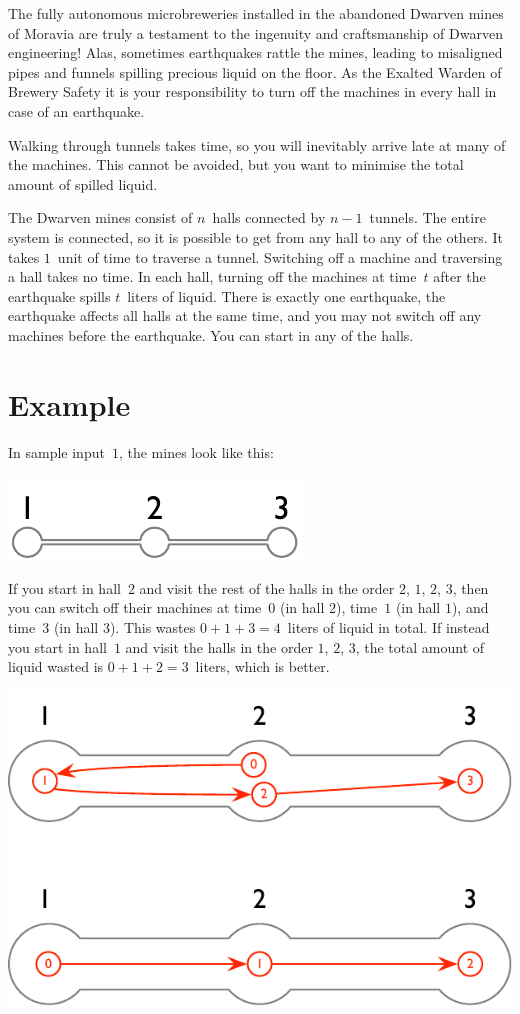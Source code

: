 
\noindent
The fully autonomous microbreweries installed in the abandoned Dwarven mines of Moravia are truly a testament to the ingenuity and craftsmanship of Dwarven engineering!
Alas, sometimes earthquakes rattle the mines, leading to misaligned pipes and funnels spilling precious liquid on the floor.
As the Exalted Warden of Brewery Safety it is your responsibility to turn off the machines in every hall in case of an earthquake.

Walking through tunnels takes time, 
so you will inevitably arrive late at many of the machines.
This cannot be avoided, but you want to minimise the total amount of spilled liquid.

\medskip
The Dwarven mines consist of $n$~halls connected by $n-1$~tunnels.
The entire system is connected, so it is possible to get from any hall to any of the others.
It takes $1$~unit of time to traverse a tunnel.
Switching off a machine and traversing a hall takes no time.
In each hall, turning off the machines at time~$t$ after the earthquake spills $t$~liters of liquid.
There is exactly one earthquake, the earthquake affects all halls at the same time, and you may not switch off any machines before the earthquake.
You can start in any of the halls.

\section*{Example}

In sample input~$1$, the mines look like this:

\includegraphics[width=.2\textwidth]{img/sample-1.pdf}

If you start in hall~$2$ and visit the rest of the halls in the order $2$, $1$, $2$, $3$, then you can switch off their machines at time~$0$ (in hall $2$), time~$1$ (in hall $1$), and time~$3$ (in hall $3$).
This wastes $0+1+3=4$~liters of liquid in total.
If instead you start in hall~$1$ and visit the halls in the order $1$, $2$, $3$, the total amount of liquid wasted is $0+1+2=3$~liters, which is better.

\includegraphics[width=.4\textwidth]{img/sample-1-ans.pdf}

